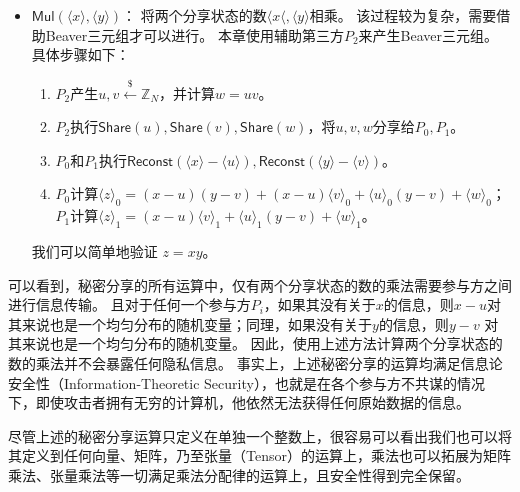 \begin{itemize}
    \item $\mathsf{Mul}(\langle x \rangle, \langle y \rangle)$：
    将两个分享状态的数$\langle x \langle, \langle y \rangle$相乘。
    该过程较为复杂，需要借助Beaver三元组才可以进行。
    本章使用辅助第三方$P_2$来产生Beaver三元组。
    具体步骤如下：
    \begin{enumerate}
        \item $P_2$产生$u, v\stackrel{\$}{\gets} \mathbb Z_N$，并计算$w = uv$。
        
        \item $P_2$执行$\mathsf{Share}(u), \mathsf{Share}(v), \mathsf{Share}(w)$，将$u, v, w$分享给$P_0, P_1$。
        
        \item $P_0$和$P_1$执行$\mathsf{Reconst}(\langle x \rangle - \langle u \rangle), \mathsf{Reconst}(\langle y \rangle - \langle v \rangle)$。

        \item $P_0$计算$\langle  z \rangle_0 = (x - u)(y - v) + (x - u)\langle v \rangle_0 + \langle u \rangle_0 (y - v) + \langle w \rangle_0$；$P_1$计算$\langle  z \rangle_1 = (x - u)\langle v \rangle_1 + \langle u \rangle_1 (y - v) + \langle w \rangle_1$。
    \end{enumerate}
    我们可以简单地验证 $z = xy$。
\end{itemize}

可以看到，秘密分享的所有运算中，仅有两个分享状态的数的乘法需要参与方之间进行信息传输。
%
且对于任何一个参与方$P_i$，如果其没有关于$x$的信息，则$x - u$对其来说也是一个均匀分布的随机变量；同理，如果没有关于$y$的信息，则$y - v$ 对其来说也是一个均匀分布的随机变量。
%
因此，使用上述方法计算两个分享状态的数的乘法并不会暴露任何隐私信息。
%
事实上，上述秘密分享的运算均满足信息论安全性（Information-Theoretic Security），也就是在各个参与方不共谋的情况下，即使攻击者拥有无穷的计算机，他依然无法获得任何原始数据的信息\cite{}。

尽管上述的秘密分享运算只定义在单独一个整数上，很容易可以看出我们也可以将其定义到任何向量、矩阵，乃至张量（Tensor）的运算上，乘法也可以拓展为矩阵乘法、张量乘法等一切满足乘法分配律的运算上，且安全性得到完全保留。

